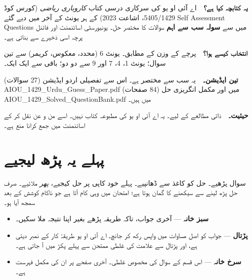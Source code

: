 \begin{tcolorbox}[enhanced, colback=bmtint, colframe=bmblue, boxrule=0.6pt,
                  arc=3pt, left=12pt, right=12pt, top=10pt, bottom=10pt]
\textbf{\color{bmblue}یہ کتابچہ کیا ہے؟}\ \
اے آئی او یو کی سرکاری درسی کتاب \emph{کاروباری ریاضی} (کورس کوڈ
\textenglish{5405/1429}، اشاعت \textenglish{2023}) کے ہر یونٹ کے آخر میں دیے گئے
\textenglish{Self Assessment Questions} میں سے \textbf{سولہ سب سے اہم} سوالات کا
مختصر حل۔ یونیورسٹی اسائنمنٹ اور فائنل پرچہ اسی ذخیرے سے بناتی ہے۔

\medskip
\textbf{\color{bmblue}انتخاب کیسے ہوا؟}\ \
پرچے کے وزن کے مطابق۔ یونٹ \textenglish{6} (محدد، معکوس، کریمر) سے تین سوال؛
یونٹ \textenglish{1}، \textenglish{4}، \textenglish{7} اور \textenglish{9} سے دو
دو؛ باقی سے ایک ایک۔

\medskip
\textbf{\color{bmblue}تین ایڈیشن۔}\ \
یہ سب سے مختصر ہے۔ اس سے تفصیلی اردو ایڈیشن
(\textenglish{27} سوالات) \textenglish{AIOU\_1429\_Urdu\_Guess\_Paper.pdf} میں
اور مکمل انگریزی حل (\textenglish{84} صفحات)
\textenglish{AIOU\_1429\_Solved\_QuestionBank.pdf} میں ہیں۔

\medskip
\textbf{\color{bmblue}حیثیت۔}\ \
ذاتی مطالعے کے لیے۔ یہ اے آئی او یو کی مطبوعہ کتاب نہیں۔ اسے من و عن نقل کر کے
اسائنمنٹ میں جمع کرانا منع ہے۔
\end{tcolorbox}

\clearpage

\section*{پہلے یہ پڑھ لیجیے}

سوال پڑھیے۔ حل کو کاغذ سے ڈھانپیے۔ پہلے خود کاپی پر حل کیجیے، \emph{پھر}
ملائیے۔ صرف حل پڑھ لینے سے سیکھنے کا گمان ہوتا ہے؛ امتحان میں وہی کام آتا ہے جو
ناکام کوشش کے بعد سمجھ آیا ہو۔

\medskip
\begin{itemize}\setlength{\itemsep}{2pt}
  \item \textbf{سبز خانہ} --- آخری جواب، تاکہ طریقہ پڑھے بغیر اپنا نتیجہ ملا سکیں۔
  \item \textbf{پڑتال} --- جواب کو اصل مساوات میں واپس رکھ کر جانچ۔ اے آئی او یو
        طریقۂ کار کے نمبر دیتی ہے، اور پڑتال سے علامت کی غلطی ممتحن سے پہلے
        پکڑ میں آ جاتی ہے۔
  \item \textbf{سرخ خانہ} --- اس قسم کے سوال کی مخصوص غلطی۔ آخری صفحے پر ان کی
        مکمل فہرست ہے۔
\end{itemize}

